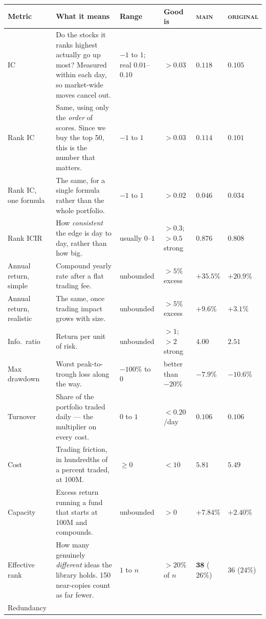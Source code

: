 \documentclass[11pt]{article}
\newcommand{\main}{\textsc{main}}
\newcommand{\orig}{\textsc{original}}
\begin{document}
\begin{table}[h]
\centering\footnotesize
\setlength{\tabcolsep}{3pt}
\renewcommand{\arraystretch}{1.12}
\begin{tabular}{@{}p{1.75cm}p{4.5cm}p{1.75cm}p{1.5cm}p{1.9cm}p{1.9cm}@{}}
\toprule
\textbf{Metric} & \textbf{What it means} & \textbf{Range} & \textbf{Good is} &
\textbf{\main{}} & \textbf{\orig{}} \\
\midrule
IC &
Do the stocks it ranks highest actually go up most? Measured within each day, so
market-wide moves cancel out. &
$-1$ to $1$; real $0.01$--$0.10$ &
$>0.03$ &
$\bm{0.118}$ & $0.105$ \\
Rank IC &
Same, using only the \emph{order} of scores. Since we buy the top 50, this is the
number that matters. &
$-1$ to $1$ &
$>0.03$ &
$\bm{0.114}$ & $0.101$ \\
Rank IC, one formula &
The same, for a single formula rather than the whole portfolio. &
$-1$ to $1$ &
$>0.02$ &
$\bm{0.046}$ & $0.034$ \\
Rank ICIR &
How \emph{consistent} the edge is day to day, rather than how big. &
usually $0$--$1$ &
$>0.3$; $>0.5$ strong &
$\bm{0.876}$ & $0.808$ \\
Annual return, simple &
Compound yearly rate after a flat trading fee. &
unbounded &
$>5\%$ excess &
$\bm{+35.5\%}$ & $+20.9\%$ \\
Annual return, realistic &
The same, once trading impact grows with size. &
unbounded &
$>5\%$ excess &
$\bm{+9.6\%}$ & $+3.1\%$ \\
Info.\ ratio &
Return per unit of risk. &
unbounded &
$>1$; $>2$ strong &
$\bm{4.00}$ & $2.51$ \\
Max drawdown &
Worst peak-to-trough loss along the way. &
$-100\%$ to $0$ &
better than $-20\%$ &
$\bm{-7.9\%}$ & $-10.6\%$ \\
Turnover &
Share of the portfolio traded daily --- the multiplier on every cost. &
$0$ to $1$ &
$<0.20$/day &
$0.106$ & $0.106$ \\
Cost &
Trading friction, in hundredths of a percent traded, at 100M. &
$\ge 0$ &
$<10$ &
$5.81$ & $\bm{5.49}$ \\
Capacity &
Excess return running a fund that starts at 100M and compounds. &
unbounded &
$>0$ &
$\bm{+7.84\%}$ & $+2.40\%$ \\
Effective rank &
How many genuinely \emph{different} ideas the library holds. 150 near-copies count as
far fewer. &
$1$ to $n$ &
$>20\%$ of $n$ &
$\bm{38}$ ($26\%$) & $36$ ($24\%$) \\
Redundancy &

\end{tabular}
\end{table}
\end{document}
